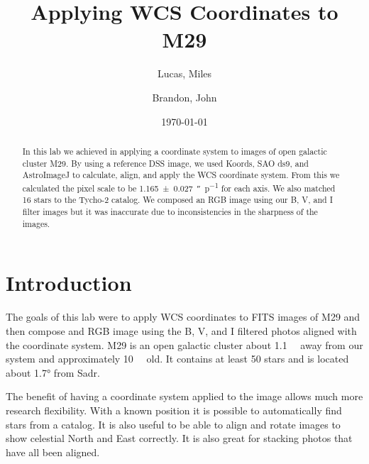 \documentclass[%
aip,
jmp,
reprint,
floatfix,
nofootinbib
]{revtex4-1}
\begin{document}
	\title[Applying WCS Coordinates to M29]{Applying WCS Coordinates to M29}

	\author{Lucas, Miles}
	\author{Brandon, John}

	\date{\today}



	\begin{abstract}
	In this lab we achieved in applying a coordinate system to images of open galactic cluster M29. By using a reference DSS image, we used Koords, SAO ds9, and AstroImageJ to calculate, align, and apply the WCS coordinate system. From this we calculated the pixel scale to be \SI{1.165\pm.027}{\arcsecond\per p} for each axis. We also matched 16 stars to the Tycho-2 catalog. We composed an RGB image using our B, V, and I filter images but it was inaccurate due to inconsistencies in the sharpness of the images.

	\end{abstract}

	\maketitle


	\section{Introduction}

	The goals of this lab were to apply WCS coordinates to FITS images of M29 and then compose and RGB image using the B, V, and I filtered photos aligned with the coordinate system. M29 is an open galactic cluster about \SI{1.1}{\kilo\parsec} away from our system and approximately \SI{10}{\mega\year} old. It contains at least 50 stars and is located about \ang{1.7} from Sadr\citep{labman}.

	The benefit of having a coordinate system applied to the image allows much more research flexibility. With a known position it is possible to automatically find stars from a catalog. It is also useful to be able to align and rotate images to show celestial North and East correctly. It is also great for stacking photos that have all been aligned.
	
\end{document}
